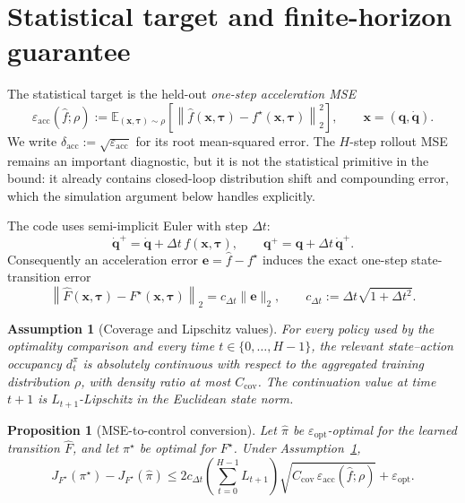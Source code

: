 \documentclass[11pt]{article}
\newtheorem{assumption}{Assumption}
\newtheorem{proposition}{Proposition}
\newcommand{\q}{\bm{q}}
\newcommand{\qd}{\dot{\bm{q}}}
\newcommand{\E}{\mathbb{E}}
\newcommand{\epsacc}{\varepsilon_{\mathrm{acc}}}
\newcommand{\dacc}{\delta_{\mathrm{acc}}}
\newcommand{\Ccov}{C_{\mathrm{cov}}}
\begin{document}
\section{Statistical target and finite-horizon guarantee}
\label{sec:bound}
The statistical target is the held-out \emph{one-step acceleration MSE}
\begin{equation}
  \epsacc(\hat f;\rho)
  := \E_{(\bm{x},\bm{\tau})\sim\rho}
  \left[\left\|\hat f(\bm{x},\bm{\tau})
  - f^\star(\bm{x},\bm{\tau})\right\|_2^2\right],
  \qquad \bm{x}=(\q,\qd).
  \label{eq:acc-mse}
\end{equation}
We write $\dacc:=\sqrt{\epsacc}$ for its root mean-squared error.  The
$H$-step rollout MSE remains an important diagnostic, but it is not the
statistical primitive in the bound: it already contains closed-loop
distribution shift and compounding error, which the simulation argument below
handles explicitly.

The code uses semi-implicit Euler with step $\Delta t$:
\[
  \qd^+ = \qd+\Delta t\,f(\bm{x},\bm{\tau}),\qquad
  \q^+ = \q+\Delta t\,\qd^+.
\]
Consequently an acceleration error $\bm e=\hat f-f^\star$ induces the exact
one-step state-transition error
\begin{equation}
  \left\|\hat F(\bm{x},\bm{\tau})-F^\star(\bm{x},\bm{\tau})\right\|_2
  = c_{\Delta t}\|\bm e\|_2,\qquad
  c_{\Delta t}:=\Delta t\sqrt{1+\Delta t^2}.
  \label{eq:integration-error}
\end{equation}

\begin{assumption}[Coverage and Lipschitz values]
\label{ass:coverage}
For every policy used by the optimality comparison and every time
$t\in\{0,\ldots,H-1\}$, the relevant state--action occupancy $d_t^\pi$ is
absolutely continuous with respect to the aggregated training distribution
$\rho$, with density ratio at most $\Ccov$.  The continuation value at time
$t+1$ is $L_{t+1}$-Lipschitz in the Euclidean state norm.
\end{assumption}

\begin{proposition}[MSE-to-control conversion]
\label{prop:simulation}
Let $\hat\pi$ be $\varepsilon_{\mathrm{opt}}$-optimal for the learned transition
$\hat F$, and let $\pi^\star$ be optimal for $F^\star$. Under
Assumption~\ref{ass:coverage},
\begin{equation}
  J_{F^\star}(\pi^\star)-J_{F^\star}(\hat\pi)
  \le
  2c_{\Delta t}\!\left(\sum_{t=0}^{H-1}L_{t+1}\right)
  \sqrt{\Ccov\,\epsacc(\hat f;\rho)}
  +\varepsilon_{\mathrm{opt}}.
  \label{eq:main-bound}
\end{equation}
\end{proposition}
\end{document}
